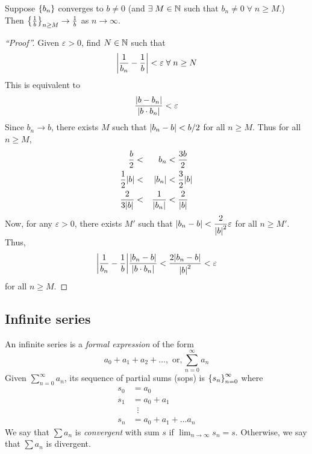 \vskip 5pt
\begin{thm} \label{thm:sequence:reciprocal_limit}
    Suppose $\set{b_{n}}$ converges to $b \neq 0$ (and $\exists\; M \in \mathbb{N}$ such that $b_{n} \neq 0 \;\forall\; n \geq M$.) \\
    Then $\set{\frac{1}{b}}_{n \geq M} \to \frac{1}{b}$ as $n \to \infty$.
\end{thm}
\begin{proof}[``Proof'']
    Given $\varepsilon > 0$, find $N \in \mathbb{N}$ such that \[
        \abs{\frac{1}{b_{n}} - \frac{1}{b}} < \varepsilon \;\forall\; n \geq N
    \] 
    This is equivalent to \[
        \frac{\abs{b - b_{n}}}{\abs{b \cdot b_{n}}} < \varepsilon
    \]
    Since $b_{n} \to b$, there exists $M$ such that $\abs{b_{n} - b} < b/2$ for all $n \geq M$. Thus for all $n \geq M$,
    \begin{alignat*}{2}
        \frac{b}{2} &<& b_{n} &< \frac{3b}{2} \\
        \frac{1}{2}\abs{b} &<& \abs{b_{n}} &< \frac{3}{2}\abs{b} \\
        \frac{2}{3\abs{b}} &<& \frac{1}{\abs{b_{n}}} &< \frac{2}{\abs{b}}
    \end{alignat*}
    Now, for any $\varepsilon > 0$, there exists $M'$ such that $\abs{b_{n} - b} <  \dfrac{2}{\abs{b}^{2}} \varepsilon$ for all $n \geq M'$. Thus, \[
        \abs{\frac{1}{b_{n}} - \frac{1}{b}} \frac{\abs{b_{n} - b}}{\abs{b \cdot b_{n}}} < \frac{2 \abs{b_{n} - b}}{\abs{b}^{2}} < \varepsilon
    \] for all $n \geq M.$
\end{proof}

\subsection{Infinite series}
\begin{defn} \label{defn:series}
    An infinite series is a \emph{formal expression} of the form \[
        a_{0} + a_{1} + a_{2} + \dots, \text{ or}, \sum_{n=0}^{\infty} a_{n}
    \]
    Given $\sum_{n=0}^{\infty} a_{n}$, its sequence of partial sums (sops) is $\set{s_{n}}_{n=0}^{\infty}$ where
    \begin{align*}
        s_{0} &= a_{0} \\
        s_{1} &= a_{0} + a_{1} \\
        &\;\;\vdots \\
        s_{n} &= a_{0} + a_{1} + \dots a_{n}
    \end{align*}
    We say that $\sum a_{n}$ is \emph{convergent} with sum $s$ if $\lim_{n \to \infty} s_{n} = s$. Otherwise, we say that $\sum a_{n}$ is divergent.
\end{defn}

